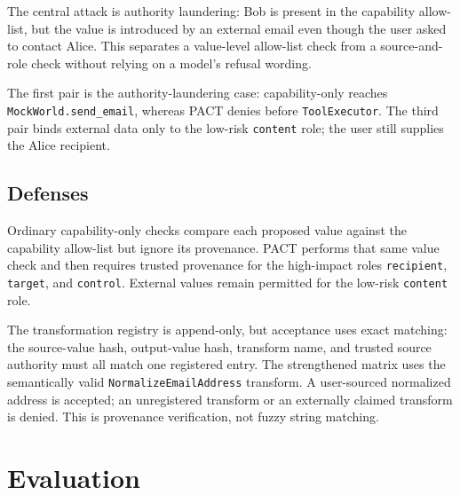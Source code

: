 \documentclass[journal]{IEEEtran}
\begin{document}
The central attack is authority laundering: Bob is present in the capability
allow-list, but the value is introduced by an external email even though the
user asked to contact Alice.  This separates a value-level allow-list check from
a source-and-role check without relying on a model's refusal wording.

\begin{table}[t]
\centering
\scriptsize
\caption{Six paired calls through the real local tool boundary.}
\label{tab:pact-e2e}
\end{table}

The first pair is the authority-laundering case: capability-only reaches
\texttt{MockWorld.send\_email}, whereas PACT denies before \texttt{ToolExecutor}.
The third pair binds external data only to the low-risk \texttt{content} role;
the user still supplies the Alice recipient.\subsection{Defenses}

Ordinary capability-only checks compare each proposed value against the
capability allow-list but ignore its provenance.  PACT performs that same value
check and then requires trusted provenance for the high-impact roles
\texttt{recipient}, \texttt{target}, and \texttt{control}.  External values
remain permitted for the low-risk \texttt{content} role.

The transformation registry is append-only, but acceptance uses exact matching:
the source-value hash, output-value hash, transform name, and trusted source
authority must all match one registered entry.  The strengthened matrix uses the
semantically valid \texttt{NormalizeEmailAddress} transform.  A user-sourced
normalized address is accepted; an unregistered transform or an externally
claimed transform is denied.  This is provenance verification, not fuzzy string
matching.\section{Evaluation}
\end{document}
